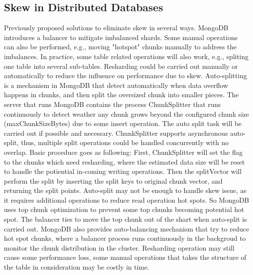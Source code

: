 \documentclass[a4paper,10pt,twoside]{article}
\begin{document}
\subsection{Skew in Distributed Databases}

Previously proposed solutions to eliminate skew in several ways.
MongoDB introduces a balancer to mitigate imbalanced shards\cite{MongoDB_balancing1}.
Some manual operations can also be performed, e.g., moving "hotspot" chunks manually to address the imbalances. 
In practice, some table related operations will also work, e.g., spliting one table into several sub-tables.
\newline
Resharding could be carried out manually or automatically to reduce the influence on performance due to skew.
Auto-splitting is a mechanism in MongoDB\cite{MongoDB_sharding1} that detect automatically when data overflow happens in chunks, 
and then split the oversized chunk into smaller pieces.
The server that runs MongoDB contains the process ChunkSplitter that runs continuously to detect weather any chunk grows beyond the configured chunk size (maxChunkSizeBytes) due to some insert operation.
\newline
The auto split task will be carried out if possible and necessary. ChunkSplitter supports asynchronous auto-split, thus, 
multiple split operations could be handled concurrently with no overlap. 
Basic proceduce goes as following: 
First, ChunkSplitter will set the flag to the chunks which need resharding, where the estimated data size will be reset to handle the potiential in-coming writing operations.
Then the splitVector will perform the split by inserting the split keys to original chunk vector, and returning the split points.
\newline
Auto-split may not be enough to handle skew issue, as it requires additional operations to reduce read operation hot spots.
So MongoDB uses top chunk optimization to prevent some top chunks becoming potential hot spot.
The balancer ties to move the top chunk out of the shart when auto-split is carried out.
MongoDB also provides auto-balancing mechanism that try to reduce hot spot chunks, where a balancer process runs continuously in the backgroud to monitor the chunk distribution in the cluster.
\newline
Resharding operation may still cause some performance loss, some manual operations that takes the structure of the table in consideration may be costly in time.
\end{document}

